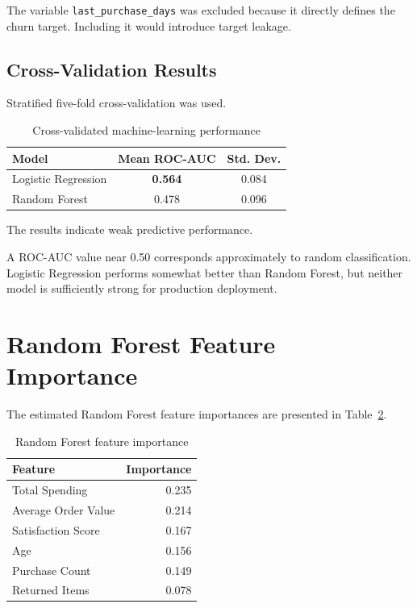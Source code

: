 \documentclass[11pt,a4paper]{article}
\begin{document}
The variable \texttt{last\_purchase\_days} was excluded because it directly defines the churn target. Including it would introduce target leakage.

\subsection{Cross-Validation Results}

Stratified five-fold cross-validation was used.

\begin{table}[H]
\centering
\caption{Cross-validated machine-learning performance}
\label{tab:ml}
\begin{tabular}{lcc}
\toprule
\textbf{Model} & \textbf{Mean ROC-AUC} & \textbf{Std. Dev.}\\
\midrule
Logistic Regression & \textbf{0.564} & 0.084\\
Random Forest & 0.478 & 0.096\\
\bottomrule
\end{tabular}
\end{table}

The results indicate weak predictive performance.

A ROC-AUC value near 0.50 corresponds approximately to random classification. Logistic Regression performs somewhat better than Random Forest, but neither model is sufficiently strong for production deployment.


\section{Random Forest Feature Importance}

The estimated Random Forest feature importances are presented in Table~\ref{tab:importance}.

\begin{table}[H]
\centering
\caption{Random Forest feature importance}
\label{tab:importance}
\begin{tabular}{lr}
\toprule
\textbf{Feature} & \textbf{Importance}\\
\midrule
Total Spending & 0.235\\
Average Order Value & 0.214\\
Satisfaction Score & 0.167\\
Age & 0.156\\
Purchase Count & 0.149\\
Returned Items & 0.078\\
\bottomrule
\end{tabular}
\end{table}
\end{document}
